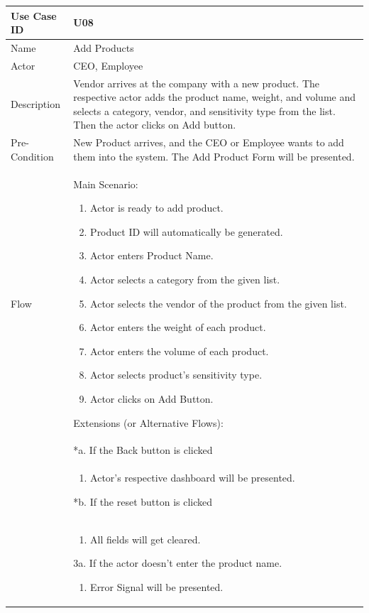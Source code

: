\documentclass[12pt,a4paper]{report}
\begin{document}
\begin{tabular}{ | m{3cm} | m{12cm}| } \hline

Use Case ID &  U08 \\\hline

Name  	    &  Add Products \\ \hline

Actor     	& CEO, Employee \\ \hline

Description &  Vendor arrives at the company with a new product. The respective actor adds the product name, weight, and volume and selects a category, vendor, and sensitivity type from the list. Then the actor clicks on Add button. \\ \hline



Pre-Condition &  New Product arrives, and the CEO or Employee wants to add them into the system. The Add Product Form will be presented. \\ \hline

Flow & Main Scenario:

\begin{enumerate}

\item Actor is ready to add product.
\item Product ID will automatically be generated.
\item Actor enters Product Name.
\item Actor selects a category from the given list.
\item Actor selects the vendor of the product from the given list.
\item Actor enters the weight of each product.
\item Actor enters the volume of each product.
\item Actor selects product's sensitivity type.
\item Actor clicks on Add Button.

\end{enumerate}

Extensions (or Alternative Flows):\\
& *a. If the Back button is clicked \\
& \begin{enumerate}
		\item Actor's respective dashboard will be presented.
	\end{enumerate}
*b. If the reset button is clicked \\
&	\begin{enumerate}
		\item All fields will get cleared.
	\end{enumerate}
3a. If the actor doesn't enter the product name.
 	\begin{enumerate}
		\item Error Signal will be presented.
	\end{enumerate}
\\ \hline
\end{tabular}
\end{document}
